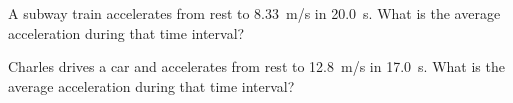 \documentclass{article}
\numberwithin{equation}{section}
\numberwithin{figure}{section}
\begin{document}





\begin{exercise} \label{Vth5N8}
    A subway train accelerates from rest to \SI{8.33}{m/s} in \SI{20.0}{s}. What is the average acceleration during that time interval?
\end{exercise}

\begin{exercise} \label{XSJU8b}
    Charles drives a car and accelerates from rest to \SI{12.8}{m/s} in \SI{17.0}{s}. What is the average acceleration during that time interval?
\end{exercise}





\end{document}

